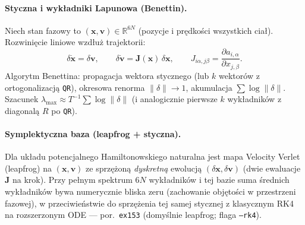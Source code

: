 %

\paragraph{Styczna i wykładniki Lapunowa (Benettin).}
Niech stan fazowy to $(\mathbf x,\mathbf v)\in\mathbb R^{6N}$ (pozycje i prędkości
wszystkich ciał). Rozwinięcie liniowe wzdłuż trajektorii:
\[
  \delta\dot{\mathbf x}=\delta\mathbf v,\qquad
  \delta\dot{\mathbf v}= \mathbf J(\mathbf x)\,\delta\mathbf x,
  \qquad
  J_{i\alpha,j\beta}=\frac{\partial a_{i,\alpha}}{\partial x_{j,\beta}}.
\]
Algorytm Benettina: propagacja wektora stycznego (lub $k$ wektorów z ortogonalizacją
\texttt{QR}), okresowa renorma $\|\delta\|\to 1$, akumulacja $\sum\log\|\delta\|$.
Szacunek $\lambda_{\max}\approx T^{-1}\sum\log\|\delta\|$ (i analogicznie pierwsze
$k$ wykładników z diagonalą $R$ po \texttt{QR}).

\paragraph{Symplektyczna baza (leapfrog + styczna).}
Dla układu potencjalnego Hamiltonowskiego naturalna jest mapa Velocity Verlet
(leapfrog) na $(\mathbf x,\mathbf v)$ ze sprzężoną \emph{dyskretną} ewolucją
$(\delta\mathbf x,\delta\mathbf v)$ (dwie ewaluacje $\mathbf J$ na krok).
Przy pełnym spektrum $6N$ wykładników i tej bazie suma średnich wykładników
bywa numerycznie bliska zeru (zachowanie objętości w przestrzeni fazowej),
w przeciwieństwie do sprzężenia tej samej stycznej z klasycznym RK4 na rozszerzonym
ODE — por.\ \texttt{ex153} (domyślnie leapfrog; flaga \texttt{--rk4}).


